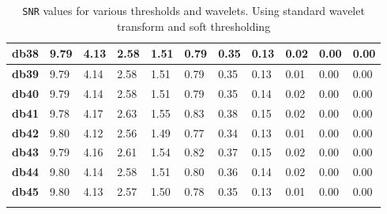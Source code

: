 \begin{tiny}
\begin{longtable}{|l|l|l|l|l|l|l|l|l|l|l|}
\textbf{db38}&9.79&4.13&2.58&1.51&0.79&0.35&0.13&0.02&0.00&0.00\\\hline
\textbf{db39}&9.79&4.14&2.58&1.51&0.79&0.35&0.13&0.01&0.00&0.00\\\hline
\textbf{db40}&9.79&4.14&2.58&1.51&0.79&0.35&0.14&0.02&0.00&0.00\\\hline
\textbf{db41}&9.78&4.17&2.63&1.55&0.83&0.38&0.15&0.02&0.00&0.00\\\hline
\textbf{db42}&9.80&4.12&2.56&1.49&0.77&0.34&0.13&0.01&0.00&0.00\\\hline
\textbf{db43}&9.79&4.16&2.61&1.54&0.82&0.37&0.15&0.02&0.00&0.00\\\hline
\textbf{db44}&9.80&4.14&2.58&1.51&0.80&0.36&0.14&0.02&0.00&0.00\\\hline
\textbf{db45}&9.80&4.13&2.57&1.50&0.78&0.35&0.13&0.01&0.00&0.00\\\hline
\caption{\texttt{SNR} values for various thresholds and wavelets. Using standard wavelet transform and soft thresholding}
\label{tab:SNRStdSoft}
\end{longtable}
\end{tiny}